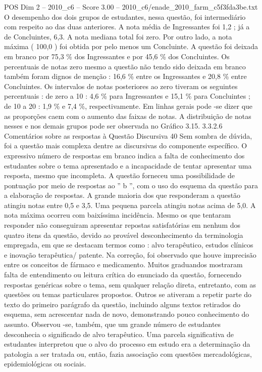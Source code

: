 \begin{textsample}{POS Dim 2 – 2010\_c6 – Score 3.00 – 2010\_c6/enade\_2010\_farm\_c5f3fda3be.txt}
O desempenho dos dois grupos de estudantes, nessa questão, foi intermediário com respeito ao das duas anteriores.
A nota média de Ingressantes foi 1,2 ; já a de Concluintes, 6,3.
A nota mediana total foi zero.
Por outro lado, a nota máxima ( 100,0 ) foi obtida por pelo menos um Concluinte.
A questão foi deixada em branco por 75,3 \% dos Ingressantes e por 45,6 \% dos Concluintes.
Os percentuais de notas zero mesmo a questão não tendo sido deixada em branco também foram dignos de menção : 16,6 \% entre os Ingressantes e 20,8 \% entre Concluintes.
Os intervalos de notas posteriores ao zero tiveram os seguintes percentuais : de zero a 10 : 4,6 \% para Ingressantes e 15,1 \% para Concluintes ; de 10 a 20 : 1,9 \% e 7,4 \%, respectivamente.
Em linhas gerais pode -se dizer que as proporções caem com o aumento das faixas de notas.
A distribuição de notas nesses e nos demais grupos pode ser observada no Gráfico 3.15. 3.3.2.6 Comentários sobre as respostas à Questão Discursiva 40 Sem sombra de dúvida, foi a questão mais complexa dentre as discursivas do componente específico.
O expressivo número de respostas em branco indica a falta de conhecimento dos estudantes sobre o tema apresentado e a incapacidade de tentar apresentar uma resposta, mesmo que incompleta.
A questão forneceu uma possibilidade de pontuação por meio de respostas ao ” b ”, com o uso do esquema da questão para a elaboração de respostas.
A grande maioria dos que responderam a questão atingiu notas entre 0,5 e 3,5.
Uma pequena parcela atingiu notas acima de 5,0.
A nota máxima ocorreu com baixíssima incidência.
Mesmo os que tentaram responder não conseguiram apresentar repostas satisfatórias em nenhum dos quatro itens da questão, devido ao provável desconhecimento da terminologia empregada, em que se destacam termos como : alvo terapêutico, estudos clínicos e inovação terapêutica/ patente.
Na correção, foi observado que houve imprecisão entre os conceitos de fármaco e medicamento.
Muitos graduandos mostraram falta de entendimento ou leitura crítica do enunciado da questão, fornecendo respostas genéricas sobre o tema, sem qualquer relação direta, entretanto, com as questões ou temas particulares propostos.
Outros se ativeram a repetir parte do texto do primeiro parágrafo da questão, incluindo alguns textos retirados do esquema, sem acrescentar nada de novo, demonstrando pouco conhecimento do assunto.
Observou -se, também, que um grande número de estudantes desconhecia o significado de alvo terapêutico.
Uma parcela significativa de estudantes interpretou que o alvo do processo em estudo era a determinação da patologia a ser tratada ou, então, fazia associação com questões mercadológicas, epidemiológicas ou sociais.

\end{textsample}
